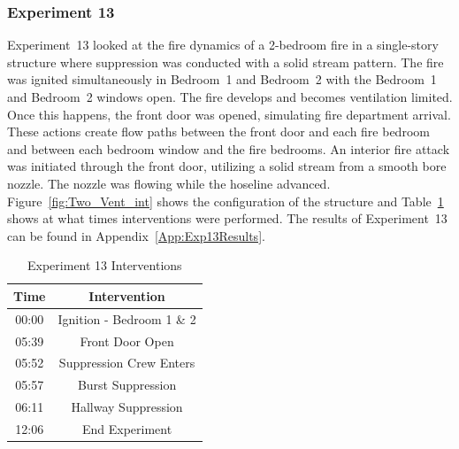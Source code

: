 \documentclass[12pt,oneside]{book}
\begin{document}
\FloatBarrier

\subsubsection{Experiment 13}
Experiment~13 looked at the fire dynamics of a 2-bedroom fire in a single-story structure where suppression was conducted with a solid stream pattern. The fire was ignited simultaneously in Bedroom~1 and Bedroom~2 with the Bedroom~1 and Bedroom~2 windows open. The fire develops and becomes ventilation limited. Once this happens, the front door was opened, simulating fire department arrival. These actions create flow paths between the front door and each fire bedroom and between each bedroom window and the fire bedrooms. An interior fire attack was initiated through the front door, utilizing a solid stream from a smooth bore nozzle. The nozzle was flowing while the hoseline advanced. Figure~\ref{fig:Two_Vent_int} shows the configuration of the structure and Table~\ref{Table:Exp13Interventions} shows at what times interventions were performed. The results of Experiment~13 can be found in Appendix~\ref{App:Exp13Results}. 


\begin{table}[H]
	\centering
	\caption{Experiment 13 Interventions}
	\begin{tabular}{|c|c|} 
		\hline
		Time & Intervention \\ \hline \hline
		00:00 & Ignition - Bedroom 1 \& 2 \\ \hline
		05:39 & Front Door Open \\ \hline
		05:52 & Suppression Crew Enters\\ \hline
		05:57 & Burst Suppression \\ \hline 
		06:11 & Hallway Suppression \\ \hline
		12:06 & End Experiment\\ \hline
	\end{tabular}
	\label{Table:Exp13Interventions}
\end{table}

\FloatBarrier
\end{document}
